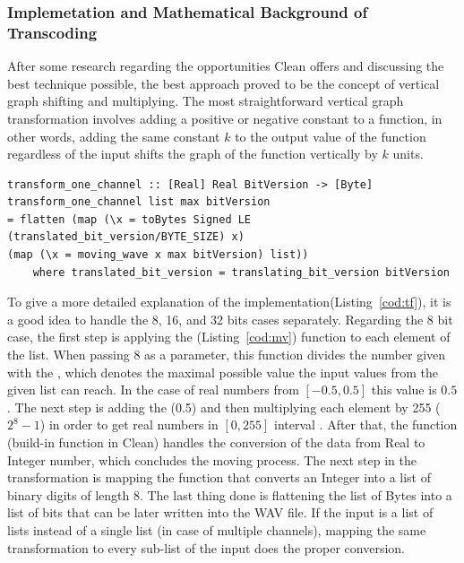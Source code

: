\documentclass[runningheads]{llncs}
\begin{document}
\subsubsection{Implemetation and Mathematical Background of Transcoding}
 After some research regarding the opportunities Clean offers and discussing the best technique possible, the best approach proved to be the concept of vertical graph shifting and multiplying. The most straightforward vertical graph transformation involves adding a positive or negative constant to a function, in other words, adding the same constant $k$ to the output value of the function regardless of the input shifts the graph of the function vertically by $k$ units. 

\begin{lstlisting}[language=Clean,label={cod:tf},caption={
The \Cl{transform\_one\_channel} function}, captionpos=b]
transform_one_channel :: [Real] Real BitVersion -> [Byte]
transform_one_channel list max bitVersion
= flatten (map (\x = toBytes Signed LE (translated_bit_version/BYTE_SIZE) x) 
(map (\x = moving_wave x max bitVersion) list))
    where translated_bit_version = translating_bit_version bitVersion
\end{lstlisting}
To give a more detailed explanation of the implementation(Listing~\ref{cod:tf}), it is a good idea to handle the 8, 16, and 32 bits cases separately. Regarding the 8 bit case, the first step is applying the  (Listing~\ref{cod:mv}) function to each element of the list.  When passing 8 as a  parameter, this function divides the number given with the , which denotes the maximal possible value the input values from the given list can reach. In the case of real numbers from $[-0.5,0.5]$ this value is $0.5$. The next step is adding the  (0.5) and then multiplying each element by 255 ($2^8-1$) in order to get real numbers in $[0,255]$ interval . After that, the function  (build-in function in Clean) handles the conversion of the data from Real to Integer number, which concludes the moving process. The next step in the transformation is mapping the function  that converts an Integer into a list of binary digits of length 8. The last thing done is flattening the list of Bytes into a list of bits that can be later written into the WAV file. If the input is a list of lists instead of a single list (in case of multiple channels), mapping the same transformation to every sub-list of the input does the proper conversion.
\end{document}
